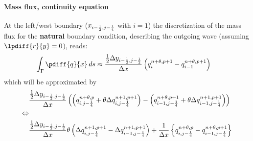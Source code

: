 \paragraph*{Mass flux, continuity equation}
At the left/west boundary ($x_{i-\frac{1}{2}, j-\frac{1}{4}}$ with $i=1$) the discretization of the mass flux for the \textbf{natural} boundary condition, describing the outgoing wave (assuming $\lpdiff{r}{y} = 0$), reads:
\begin{align}
    \int_\Gamma \pdiff{q}{x}\, ds & \approx \frac{\half\Dy_{i-\half, j-\half}}{\Dx} \left(  q^{n+\theta, p+1}_{i} - q^{n+\theta, p+1}_{i-1} \right)
\end{align}
which will be approximated by
\begin{align}
    &\frac{\frac{1}{2}\Delta y_{i-\frac{1}{2}, j-\frac{1}{2}}}{\Delta x} \left( \left( q^{n+\theta, p}_{i, j-\frac{1}{4}} + \theta \Delta q^{n+1, p+1}_{i, j-\frac{1}{4}}\right)
    - \left( q^{n+\theta, p+1}_{i-1, j-\frac{1}{4}} + \theta \Delta q^{n+1, p+1}_{i-1, j-\frac{1}{4}}\right) \right)
    \\
    \Leftrightarrow &
    \\
    &\frac{\frac{1}{2}\Delta y_{i-\frac{1}{2}, j-\frac{1}{2}}}{\Delta x} \theta \left( \Delta q^{n+1, p+1}_{i, j-\frac{1}{4}} - \Delta q^{n+1, p+1}_{i-1, j-\frac{1}{4}}\right) +
    \frac{1}{\Delta x} \left\{ q^{n+\theta, p}_{i, j-\frac{1}{4}} - q^{n+\theta, p+1}_{i-1, j-\frac{1}{4}} \right\}
\end{align}
